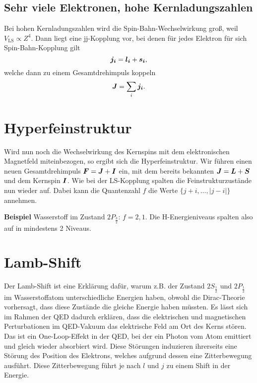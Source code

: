 \subsection{Sehr viele Elektronen, hohe Kernladungszahlen}
Bei hohen Kernladungszahlen wird die Spin-Bahn-Wechselwirkung groß, weil $V_\text{LS}\propto Z^4$.
Dann liegt eine jj-Kopplung vor, bei denen für jedes Elektron für sich Spin-Bahn-Kopplung gilt
\begin{equation*}
	\boldsymbol{j_i} = \boldsymbol{l_i} + \boldsymbol{s_i},
\end{equation*}
welche dann zu einem Gesamtdrehimpuls koppeln
\begin{equation*}
 \boldsymbol{J} = \sum_i\boldsymbol{j_i}.
\end{equation*}

\section{Hyperfeinstruktur}
Wird nun noch die Wechselwirkung des Kernspins mit dem elektronischen Magnetfeld miteinbezogen, so ergibt sich die Hyperfeinstruktur.
Wir führen einen neuen Gesamtdrehimpuls $\boldsymbol{F} = \boldsymbol{J} + \boldsymbol{I}$ ein, mit dem bereits bekannten $\boldsymbol{J} = \boldsymbol{L} + \boldsymbol{S}$ und dem Kernspin $\boldsymbol{I}$.
Wie bei der LS-Kopplung spalten die Feinstrukturzustände nun wieder auf.
Dabei kann die Quantenzahl $f$ die Werte $\{j+i,\dots,|j-i|\}$ annehmen.

\textbf{Beispiel}  Wasserstoff im Zustand $2P_\frac{3}{2}$: $f=2,1$.
Die H-Energieniveaus spalten also auf in mindestens 2 Niveaus.

\section{Lamb-Shift}
Der Lamb-Shift ist eine Erklärung dafür, warum z.B. der Zustand $2S_\frac{1}{2}$ und $2P_\frac{1}{2}$ im Wasserstoffatom unterschiedliche Energien haben, obwohl die Dirac-Theorie vorhersagt, dass diese Zustände die gleiche Energie haben müssten.
Es lässt sich im Rahmen der QED dadurch erklären, dass die elektrischen und magnetischen Perturbationen im QED-Vakuum das elektrische Feld am Ort des Kerns stören.
Das ist ein One-Loop-Effekt in der QED, bei der ein Photon vom Atom emittiert und gleich wieder absorbiert wird.
Diese Störungen induzieren ihrerseits eine Störung des Position des Elektrons, welches aufgrund dessen eine Zitterbewegung ausführt.
Diese Zitterbewegung führt je nach $l$ und $j$ zu einem Shift in der Energie.
